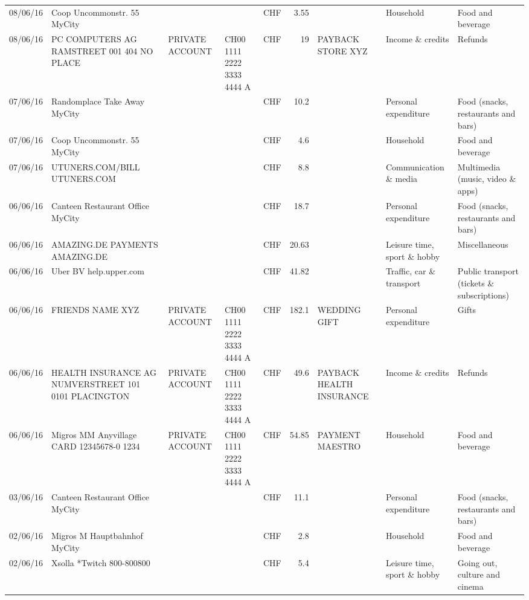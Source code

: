 \begin{landscape}
\begin{table}[h]
\begin{center}
\begin{tabular}{rllllrlll}
		08/06/16 & Coop Uncommonstr. 55   MyCity &       &       & CHF   & 3.55  &       & Household & Food and beverage \\
		08/06/16 & PC COMPUTERS AG RAMSTREET 001 404 NO PLACE & PRIVATE ACCOUNT & CH00 1111 2222 3333 4444 A & CHF   & 19    & PAYBACK STORE XYZ & Income \& credits & Refunds \\
		07/06/16 & Randomplace Take Away     MyCity &       &       & CHF   & 10.2  &       & Personal expenditure & Food (snacks, restaurants and bars) \\
		07/06/16 & Coop Uncommonstr. 55   MyCity &       &       & CHF   & 4.6   &       & Household & Food and beverage \\
		07/06/16 & UTUNERS.COM/BILL          UTUNERS.COM &       &       & CHF   & 8.8   &       & Communication \& media & Multimedia (music, video \& apps) \\
		06/06/16 & Canteen Restaurant Office      MyCity &       &       & CHF   & 18.7  &       & Personal expenditure & Food (snacks, restaurants and bars) \\
		06/06/16 & AMAZING.DE PAYMENTS       AMAZING.DE &       &       & CHF   & 20.63 &       & Leisure time, sport \& hobby & Miscellaneous \\
		06/06/16 & Uber BV                  help.upper.com &       &       & CHF   & 41.82 &       & Traffic, car \& transport & Public transport (tickets \& subscriptions) \\
		06/06/16 & FRIENDS NAME XYZ & PRIVATE ACCOUNT & CH00 1111 2222 3333 4444 A & CHF   & 182.1 & WEDDING GIFT & Personal expenditure & Gifts \\
		06/06/16 & HEALTH INSURANCE AG NUMVERSTREET 101 0101 PLACINGTON & PRIVATE ACCOUNT & CH00 1111 2222 3333 4444 A & CHF   & 49.6  & PAYBACK HEALTH INSURANCE & Income \& credits & Refunds \\
		06/06/16 & Migros MM Anyvillage CARD 12345678-0 1234 & PRIVATE ACCOUNT & CH00 1111 2222 3333 4444 A & CHF   & 54.85 & PAYMENT MAESTRO & Household & Food and beverage \\
		03/06/16 & Canteen Restaurant Office      MyCity &       &       & CHF   & 11.1  &       & Personal expenditure & Food (snacks, restaurants and bars) \\
		02/06/16 & Migros M Hauptbahnhof    MyCity &       &       & CHF   & 2.8   &       & Household & Food and beverage \\
		02/06/16 & Xsolla *Twitch           800-800800 &       &       & CHF   & 5.4   &       & Leisure time, sport \& hobby & Going out, culture and cinema \\

\end{tabular}
\end{center}
\end{table}
\end{landscape}
